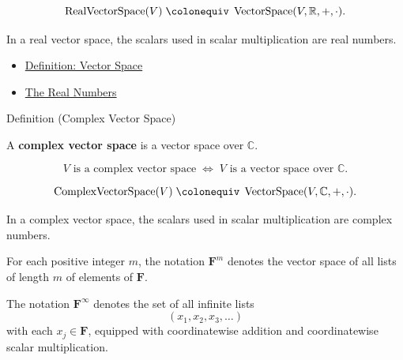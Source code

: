 \begin{remark*}
\[
\operatorname{RealVectorSpace}(V)
\;\colonequiv\;
\operatorname{VectorSpace}(V,\mathbb{R},+,\cdot).
\]
\end{remark*}

\begin{remark*}[Interpretation]
In a real vector space, the scalars used in scalar multiplication are real numbers.
\end{remark*}

\begin{dependencies}
\begin{itemize}
  \item \hyperref[def:vector-space]{Definition: Vector Space}
  \item \hyperref[def:reals]{The Real Numbers}
\end{itemize}
\end{dependencies}


\begin{definitionbox}{Definition (Complex Vector Space)}
\begin{definition}
\label{def:complex-vector-space}
A \textbf{complex vector space} is a vector space over $\mathbb{C}$.
\end{definition}
\end{definitionbox}

\begin{remark*}
\[
V \text{ is a complex vector space}
\;\Longleftrightarrow\;
V \text{ is a vector space over } \mathbb{C}.
\]
\end{remark*}

\begin{remark*}
\[
\operatorname{ComplexVectorSpace}(V)
\;\colonequiv\;
\operatorname{VectorSpace}(V,\mathbb{C},+,\cdot).
\]
\end{remark*}

\begin{remark*}[Interpretation]
In a complex vector space, the scalars used in scalar multiplication are complex numbers.
\end{remark*}

\begin{remark*}[Notation]
For each positive integer $m$, the notation $\mathbf{F}^m$ denotes the vector
space of all lists of length $m$ of elements of $\mathbf{F}$.

The notation $\mathbf{F}^{\infty}$ denotes the set of all infinite lists
\[
(x_1,x_2,x_3,\dots)
\]
with each $x_j \in \mathbf{F}$, equipped with coordinatewise addition and
coordinatewise scalar multiplication.
\end{remark*}

